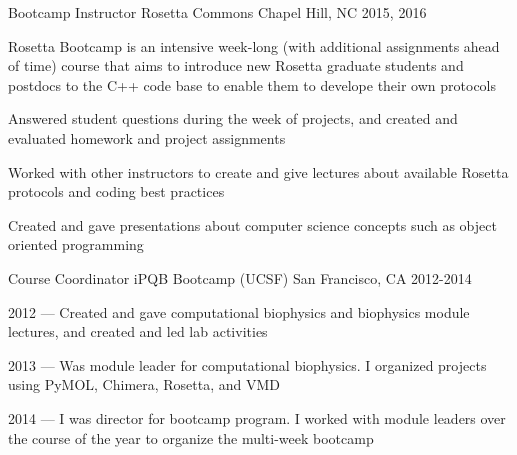 

\begin{cventries}

  \cventry
  {Bootcamp Instructor} %
  {Rosetta Commons} %
  {Chapel Hill, NC} %
  {2015, 2016} %
  {
    \begin{cvitems} %
    \item Rosetta Bootcamp is an intensive week-long (with additional assignments ahead of time) course
      that aims to introduce new Rosetta graduate students and postdocs to the C++ code base
      to enable them to develope their own protocols
    \item Answered student questions during the week of projects, and created and evaluated homework and project assignments
    \item Worked with other instructors to create and give lectures about available Rosetta protocols and coding best practices
    \item Created and gave presentations about computer science concepts such as object oriented programming
    \end{cvitems}
  }

  \cventry
  {Course Coordinator} %
  {iPQB Bootcamp (UCSF)} %
  {San Francisco, CA} %
  {2012-2014} %
  {
    \begin{cvitems} %
    \item {2012 --- Created and gave computational biophysics and biophysics module lectures, and created and led lab activities}
    \item {2013 --- Was module leader for computational biophysics. I organized projects using PyMOL, Chimera, Rosetta, and VMD}
    \item {2014 --- I was director for bootcamp program. I worked with module leaders over the course of the year to organize the multi-week bootcamp}
    \end{cvitems}
  }


\end{cventries}

